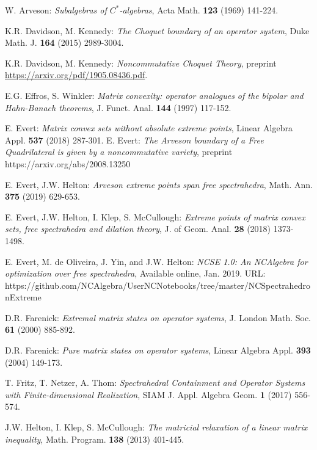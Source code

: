 \begin{thebibliography}{1}
	 W. Arveson:
	{\it Subalgebras of $C^*$-algebras}, Acta Math. {\bf 123} (1969) 141-224.
		
	
	 K.R. Davidson, M. Kennedy:
	{\it The Choquet boundary of an operator system}, Duke Math. J. {\bf 164} (2015) 2989-3004.
	
	K.R. Davidson, M. Kennedy:
	\textit{Noncommutative Choquet Theory},
	preprint \url{https://arxiv.org/pdf/1905.08436.pdf}.
	
	
	 E.G. Effros, S. Winkler: {\it Matrix convexity: operator analogues of the bipolar and Hahn-Banach theorems}, J. 
	Funct. Anal. {\bf 144} (1997) 117-152.
	
	 E. Evert: {\it Matrix convex sets without absolute extreme points}, Linear Algebra Appl. {\bf 537} (2018) 
	287-301.		
	E. Evert: {\it The Arveson boundary of a Free Quadrilateral is given by a noncommutative variety}, preprint
		https://arxiv.org/abs/2008.13250
	
	 E. Evert, J.W. Helton: {\it Arveson extreme points span free spectrahedra},	Math. Ann. {\bf 375} (2019) 
	629-653.
	
	E. Evert, J.W. Helton, I. Klep, S. McCullough:
	{\it Extreme points of matrix convex sets, free spectrahedra and dilation theory},
	J. of Geom. Anal. {\bf 28} (2018) 1373-1498.
	
	 E. Evert, M. de Oliveira, J. Yin, and J.W. Helton: {\it NCSE 1.0: An NCAlgebra for optimization over free 
	spectrahedra}, Available online, Jan. 2019. URL:
	https://github.com/NCAlgebra/UserNCNotebooks/tree/master/NCSpectrahedronExtreme
	
	 D.R. Farenick:
	{\it Extremal matrix states on operator systems}, J. London Math. Soc. {\bf 61} (2000) 885-892.
	
	 D.R. Farenick:
	{\it Pure matrix states on operator systems}, Linear Algebra Appl. {\bf 393} (2004) 149-173.
	
		
	 T. Fritz, T. Netzer, A. Thom: {\it Spectrahedral Containment and Operator Systems with Finite-dimensional 
	Realization}, SIAM J. Appl. Algebra Geom. {\bf 1} (2017) 556-574.
	
	
	 J.W. Helton, I. Klep, S. McCullough: {\it The matricial relaxation of a linear matrix inequality}, Math. 
	Program. {\bf 138} (2013) 401-445.
	

\end{thebibliography}
